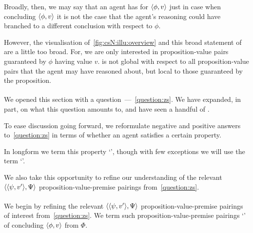 \begin{note}
  Broadly, then, we may say that an agent has \csVed{} for \(\langle \phi, v \rangle\) just in case when concluding \(\langle \phi, v \rangle\) it is not the case that the agent's reasoning could have branched to a different conclusion with respect to \(\phi\).

  However, the visualisation of~\autoref{fig:csN:illu:overview} and this broad statement of \csN{} are a little too broad.
  For, we are only interested in proposition-value pairs guaranteed by \(\phi\) having value \(v\).
  \csN{} is not global with respect to all proposition-value pairs that the agent may have reasoned about, but local to those guaranteed by the proposition.
\end{note}

\paragraph*{}

\begin{note}
  We opened this section with a question~---~\autoref{question:zs}.
  We have expanded, in part, on what this question amounts to, and have seen a handful of .

  To ease discussion going forward, we reformulate negative and positive answers to~\autoref{question:zs} in terms of whether an agent satisfies a certain property.

  In longform we term this property `', though with few exceptions we will use the term `'.

  We also take this opportunity to refine our understanding of the relevant \(\langle \langle \psi, v' \rangle, \Psi \rangle\) proposition-value-premise pairings from~\autoref{question:zs}.
\end{note}

\paragraph*{}

\begin{note}
  We begin by refining the relevant \(\langle \langle \psi, v' \rangle, \Psi \rangle\) proposition-value-premise pairings of interest from~\autoref{question:zs}.
  We term such proposition-value-premise pairings `' of concluding \(\langle \phi, v \rangle\) from \(\Phi\).
\end{note}

